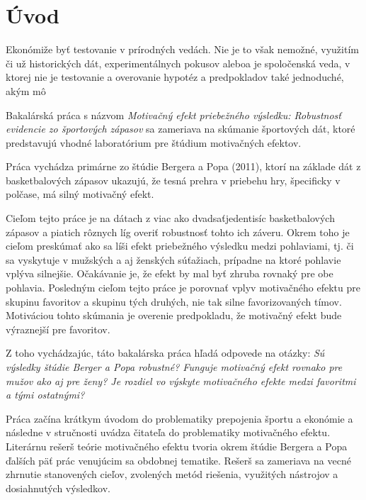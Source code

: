 \documentclass[
  digital, %
  twoside, %
  notable,   %
  lof,     %
  lot,     %
]{fithesis3}
\begin{document}
	\renewcommand{\listfigurename}{Zoznam grafov}
	\makeatletter
	\thesis@preamble %
	\makeatother
	
	\chapter*{Úvod}
	
	Ekonómiže byť testovanie v prírodných vedách. Nie je to však nemožné, využitím či už historických dát, experimentálnych pokusov aleboa je spoločenská veda, v ktorej nie je testovanie a overovanie hypotéz a predpokladov také jednoduché, akým mô  
	
	Bakalárská práca  s názvom \textit{Motivačný efekt priebežného výsledku: Robustnosť evidencie zo športových zápasov} sa zameriava na skúmanie športových dát, ktoré predstavujú vhodné laboratórium pre štúdium motivačných efektov.
	
	Práca vychádza primárne zo štúdie Bergera a Popa (2011), ktorí na základe dát z basketbalových zápasov ukazujú, že tesná prehra v priebehu hry, špecificky v polčase, má silný motivačný efekt. 
	
	Cieľom tejto práce je na dátach z viac ako dvadsaťjedentisíc  basketbalových zápasov a piatich rôznych líg overiť robustnosť tohto ich záveru. Okrem toho je cieľom preskúmať ako sa líši efekt priebežného výsledku medzi pohlaviami, tj. či sa vyskytuje v mužských a aj ženských súťažiach, prípadne na ktoré pohlavie vplýva silnejšie. Očakávanie je, že efekt by mal byť zhruba rovnaký pre obe pohlavia. Posledným cieľom tejto práce je porovnať vplyv motivačného efektu pre skupinu favoritov a skupinu tých druhých, nie tak silne favorizovaných tímov. Motiváciou tohto skúmania je overenie predpokladu, že motivačný efekt bude výraznejší pre favoritov.
	
	Z toho vychádzajúc, táto bakalárska práca hľadá odpovede na otázky: \textit{Sú výsledky štúdie Berger a Popa robustné? Funguje motivačný efekt rovnako pre mužov ako aj pre ženy? Je rozdiel vo výskyte motivačného efekte medzi favoritmi a tými ostatnými?} 
	
	Práca začína krátkym úvodom do problematiky prepojenia športu a ekonómie a následne v stručnosti uvádza čitateľa do problematiky  motivačného efektu. Literárnu rešerš teórie motivačného efektu tvoria okrem štúdie Bergera a Popa ďalších päť prác venujúcim sa obdobnej tematike. Rešerš sa zameriava na vecné zhrnutie stanovených cieľov, zvolených metód riešenia, využitých nástrojov a dosiahnutých výsledkov. 
	
\end{document}
